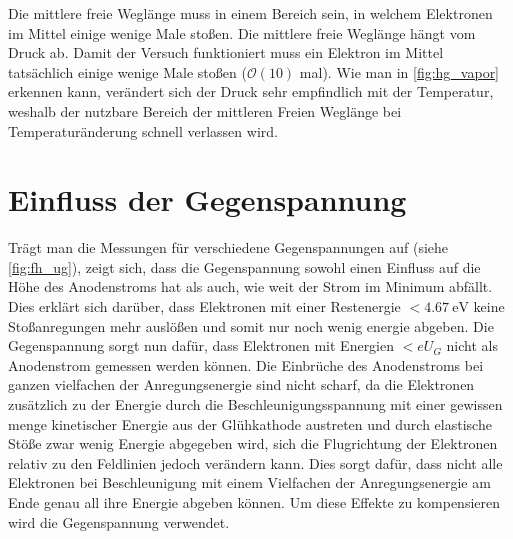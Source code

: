 Die mittlere freie Weglänge muss in einem Bereich sein, in welchem Elektronen im Mittel einige wenige Male stoßen. Die mittlere freie Weglänge hängt vom Druck ab. Damit der Versuch funktioniert muss ein Elektron im Mittel tatsächlich einige wenige Male stoßen ($\mathcal{O}(10)$ mal). Wie man in \ref{fig:hg_vapor} erkennen kann, verändert sich der Druck sehr empfindlich mit der Temperatur, weshalb der nutzbare Bereich der mittleren Freien Weglänge bei Temperaturänderung schnell verlassen wird.



\section{Einfluss der Gegenspannung}

Trägt man die Messungen für verschiedene Gegenspannungen auf (siehe \ref{fig:fh_ug}), zeigt sich, dass die Gegenspannung sowohl einen Einfluss auf die Höhe des Anodenstroms hat als auch, wie weit der Strom im Minimum abfällt. Dies erklärt sich darüber, dass Elektronen mit einer Restenergie $<\SI{4.67}{\electronvolt}$ keine Stoßanregungen mehr auslößen und somit nur noch wenig energie abgeben. Die Gegenspannung sorgt nun dafür, dass Elektronen mit Energien $< e U_G$ nicht als Anodenstrom gemessen werden können. Die Einbrüche des Anodenstroms bei ganzen vielfachen der Anregungsenergie sind nicht scharf, da die Elektronen zusätzlich zu der Energie durch die Beschleunigungsspannung mit einer gewissen menge kinetischer Energie aus der Glühkathode austreten und durch elastische Stöße zwar wenig Energie abgegeben wird, sich die Flugrichtung der Elektronen relativ zu den Feldlinien jedoch verändern kann. Dies sorgt dafür, dass nicht alle Elektronen bei Beschleunigung mit einem Vielfachen der Anregungsenergie am Ende genau all ihre Energie abgeben können. Um diese Effekte zu kompensieren wird die Gegenspannung verwendet.
